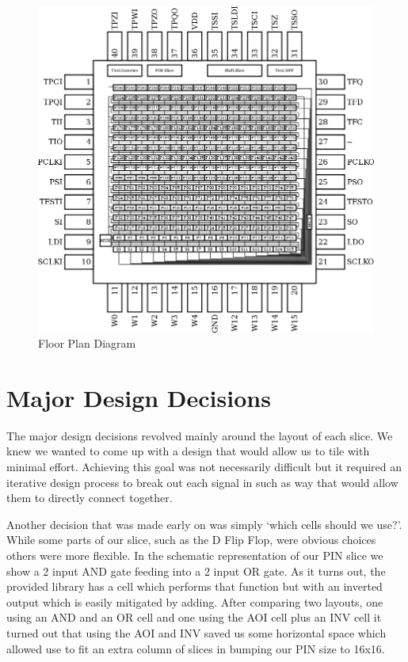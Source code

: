     \begin{figure}[H]
        \centering
        \includegraphics[width=\linewidth]{../floorplan/floorplan.png}
        \caption{Floor Plan Diagram}
        \label{fig:floorplan}
    \end{figure}

\section{Major Design Decisions}

The major design decisions revolved mainly around the layout of each slice. We
knew we wanted to come up with a design that would allow us to tile with
minimal effort.  Achieving this goal was not necessarily difficult but it
required an iterative design process to break out each signal in such as way
that would allow them to directly connect together.

Another decision that was made early on was simply `which cells should we use?'.
While some parts of our slice, such as the D Flip Flop, were obvious choices
others were more flexible. In the schematic representation of our PIN slice we
show a 2 input AND gate feeding into a 2 input OR gate. As it turns out, the
provided library has a cell which performs that function but with an inverted
output which is easily mitigated by adding. After comparing two layouts, one
using an AND and an OR cell and one using the AOI cell plus an INV cell it
turned out that using the AOI and INV saved us some horizontal space which
allowed use to fit an extra column of slices in bumping our PIN size to 16x16.

